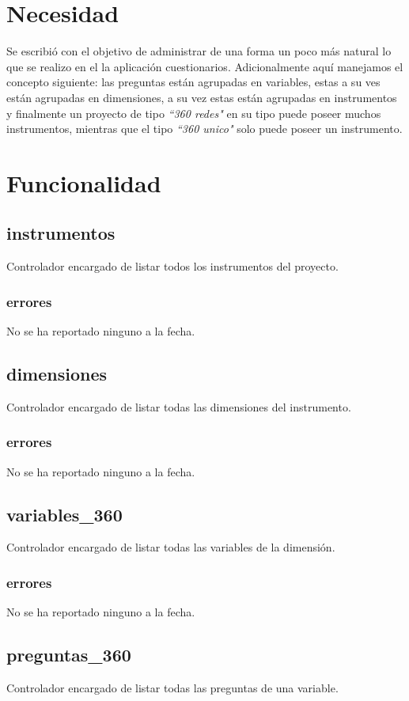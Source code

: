 \documentclass[10pt,a4paper]{book}
\begin{document}
	\section{Necesidad}

	Se escribió con el objetivo de administrar de una forma un poco más natural lo que se realizo en el la aplicación cuestionarios. Adicionalmente aquí manejamos el concepto siguiente: las preguntas están agrupadas en variables, estas a su ves están agrupadas en dimensiones, a su vez estas están agrupadas en instrumentos y finalmente un proyecto de tipo \textit{``360 redes"} en su tipo puede poseer muchos instrumentos, mientras que el tipo \textit{``360 unico"} solo puede poseer un instrumento.

	\section{Funcionalidad}

	\subsection{instrumentos}
	Controlador encargado de listar todos los instrumentos del proyecto.
	\subsubsection{errores}
	No se ha reportado ninguno a la fecha.

	\subsection{dimensiones}
	Controlador encargado de listar todas las dimensiones del instrumento.
	\subsubsection{errores}
	No se ha reportado ninguno a la fecha.

	\subsection{variables\_360}
	Controlador encargado de listar todas las variables de la dimensión.
	\subsubsection{errores}
	No se ha reportado ninguno a la fecha.

	\subsection{preguntas\_360}
	Controlador encargado de listar todas las preguntas de una variable.
\end{document}
